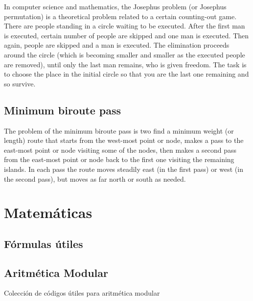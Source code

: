 \documentclass[10pt,letterpaper,twocolumn,twosided]{article}
\newcommand{\codigofuente}[1]{

\dotfill
}
\begin{document}
In computer science and mathematics, the Josephus problem (or Josephus permutation) is a theoretical problem related to a certain counting-out game.
There are people standing in a circle waiting to be executed. After the first man is executed, certain number of people are skipped and one man is executed. Then again, people are skipped and a man is executed. The elimination proceeds around the circle (which is becoming smaller and smaller as the executed people are removed), until only the last man remains, who is given freedom.
The task is to choose the place in the initial circle so that you are the last one remaining and so survive.

\codigofuente{src/dp/josephus.cpp}

\subsection{Minimum biroute pass}

The problem of the minimum biroute pass is two find a minimum weight (or length) route that starts from the west-most point or node, makes a pass to the east-most point or node visiting some of the nodes, then makes a second pass from the east-most point or node back to the first one visiting the remaining islands. In each pass the route moves steadily east (in the first pass) or west (in the second pass), but moves as far north or south as needed.

\codigofuente{src/dp/biroute.cpp}

\section{Matemáticas}

\subsection{Fórmulas útiles}


\subsection{Aritmética Modular}

Colección de códigos útiles para aritmética modular\\
\end{document}
